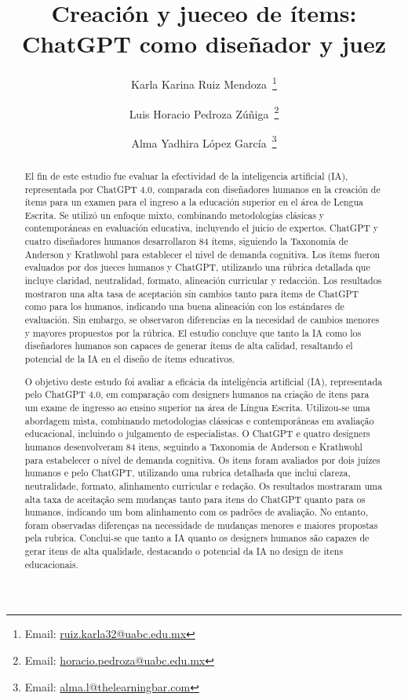 \documentclass[spanish]{textolivre}
\title{Creación y jueceo de ítems: ChatGPT como diseñador y juez}
\author[1]{Karla Karina Ruiz Mendoza~\orcid{0000-0001-8978-8364}\thanks{Email: \href{mailto:ruiz.karla32@uabc.edu.mx}{ruiz.karla32@uabc.edu.mx}}}
\author[1]{Luis Horacio Pedroza Zúñiga~\orcid{0000-0002-5256-2967}\thanks{Email: \href{mailto:horacio.pedroza@uabc.edu.mx}{horacio.pedroza@uabc.edu.mx}}}
\author[2]{Alma Yadhira López García~\orcid{0000-0002-7474-5799}\thanks{Email: \href{mailto:alma.l@thelearningbar.com}{alma.l@thelearningbar.com}}}
\affil[1]{Universidad Autónoma de Baja, California, IIDE, Ensenada, Baja California, México.}
\affil[2]{TheLearning Bar, Canadá.}
\begin{document}
\maketitle
\begin{polyabstract}
\begin{abstract}
El fin de este estudio fue evaluar la efectividad de la inteligencia
artificial (IA), representada por ChatGPT 4.0, comparada con diseñadores
humanos en la creación de ítems para un examen para el ingreso a la
educación superior en el área de Lengua Escrita. Se utilizó un enfoque
mixto, combinando metodologías clásicas y contemporáneas en evaluación
educativa, incluyendo el juicio de expertos. ChatGPT y cuatro
diseñadores humanos desarrollaron 84 ítems, siguiendo la Taxonomía de
Anderson y Krathwohl para establecer el nivel de demanda cognitiva. Los
ítems fueron evaluados por dos jueces humanos y ChatGPT, utilizando una
rúbrica detallada que incluye claridad, neutralidad, formato, alineación
curricular y redacción. Los resultados mostraron una alta tasa de
aceptación sin cambios tanto para ítems de ChatGPT como para los
humanos, indicando una buena alineación con los estándares de
evaluación. Sin embargo, se observaron diferencias en la necesidad de
cambios menores y mayores propuestos por la rúbrica. El estudio concluye
que tanto la IA como los diseñadores humanos son capaces de generar
ítems de alta calidad, resaltando el potencial de la IA en el diseño de
ítems educativos.

\end{abstract}

\begin{portuguese}
\begin{abstract}
O objetivo deste estudo foi avaliar a eficácia da inteligência
artificial (IA), representada pelo ChatGPT 4.0, em comparação com
designers humanos na criação de itens para um exame de ingresso ao
ensino superior na área de Língua Escrita. Utilizou-se uma abordagem
mista, combinando metodologias clássicas e contemporâneas em avaliação
educacional, incluindo o julgamento de especialistas. O ChatGPT e quatro
designers humanos desenvolveram 84 itens, seguindo a Taxonomia de
Anderson e Krathwohl para estabelecer o nível de demanda cognitiva. Os
itens foram avaliados por dois juízes humanos e pelo ChatGPT, utilizando
uma rubrica detalhada que inclui clareza, neutralidade, formato,
alinhamento curricular e redação. Os resultados mostraram uma alta taxa
de aceitação sem mudanças tanto para itens do ChatGPT quanto para os
humanos, indicando um bom alinhamento com os padrões de avaliação. No
entanto, foram observadas diferenças na necessidade de mudanças menores
e maiores propostas pela rubrica. Conclui-se que tanto a IA quanto os
designers humanos são capazes de gerar itens de alta qualidade,
destacando o potencial da IA no design de itens educacionais.



\end{abstract}
\end{portuguese}
\end{polyabstract}
\end{document}
